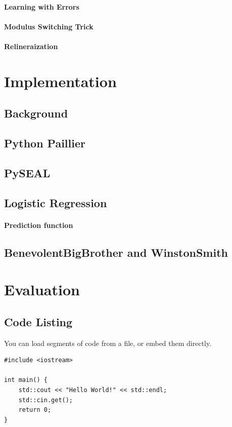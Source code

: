 \documentclass[10pt, a4paper]{article}
\begin{document}
	\paragraph{Learning with Errors}

	\paragraph{Modulus Switching Trick}
	\paragraph{Relineraization}
	
	\section{Implementation}
	\subsection{Background}
	\subsection{Python Paillier}
	\subsection{PySEAL}
	\subsection{Logistic Regression}
	\paragraph{Prediction function}
	\subsection{BenevolentBigBrother and WinstonSmith}
	
	\section{Evaluation}
	
	\subsection{Code Listing}
    You can load segments of code from a file, or embed them directly.
    
\begin{lstlisting}[caption = Hello World! in c++]
#include <iostream>

int main() {
    std::cout << "Hello World!" << std::endl;
    std::cin.get();
    return 0;
}
\end{lstlisting}
    
\end{document}
